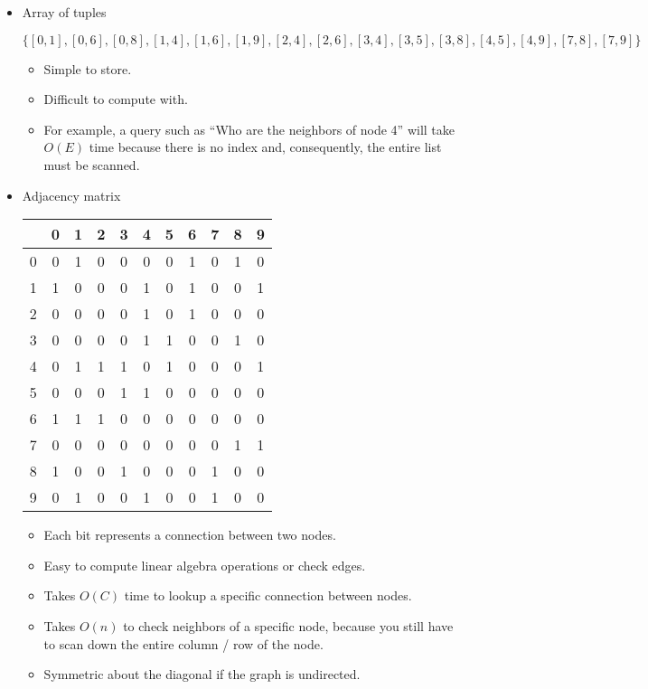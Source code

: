 \begin{itemize}
	\item Array of tuples
	\begin{center}
		$\{[0,1],[0,6],[0,8],[1,4],[1,6],[1,9],[2,4],[2,6],[3,4],[3,5],[3,8],[4,5],[4,9],[7,8],[7,9]\}$
	\end{center}
	\begin{itemize}
		\item Simple to store.
		\item Difficult to compute with.
		\item For example, a query such as ``Who are the neighbors of node 4'' will take $O(E)$ time because there is no index and, consequently, the entire list must be scanned.
	\end{itemize}
	\item Adjacency matrix
	\begin{table}[ht]
	\centering
		\begin{tabular}{c|cccccccccc}
		 & 0 & 1 & 2 & 3 & 4 & 5 & 6 & 7 & 8 & 9\\
		\hline
		0 & 0 & 1 & 0 & 0 & 0 & 0 & 1 & 0 & 1 & 0\\
		1 & 1 & 0 & 0 & 0 & 1 & 0 & 1 & 0 & 0 & 1\\
		2 & 0 & 0 & 0 & 0 & 1 & 0 & 1 & 0 & 0 & 0\\
		3 & 0 & 0 & 0 & 0 & 1 & 1 & 0 & 0 & 1 & 0\\
		4 & 0 & 1 & 1 & 1 & 0 & 1 & 0 & 0 & 0 & 1\\
		5 & 0 & 0 & 0 & 1 & 1 & 0 & 0 & 0 & 0 & 0\\
		6 & 1 & 1 & 1 & 0 & 0 & 0 & 0 & 0 & 0 & 0\\
		7 & 0 & 0 & 0 & 0 & 0 & 0 & 0 & 0 & 1 & 1\\
		8 & 1 & 0 & 0 & 1 & 0 & 0 & 0 & 1 & 0 & 0\\
		9 & 0 & 1 & 0 & 0 & 1 & 0 & 0 & 1 & 0 & 0
		\end{tabular}
	\end{table}
	\begin{itemize}
		\item Each bit represents a connection between two nodes.
		\item Easy to compute linear algebra operations or check edges.
		\item Takes $O(C)$ time to lookup a specific connection between nodes.
		\item Takes $O(n)$ to check neighbors of a specific node, because you still have to scan down the entire column / row of the node.
		\item Symmetric about the diagonal if the graph is undirected.

\end{itemize}
\end{itemize}
